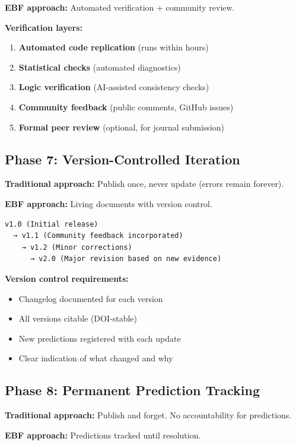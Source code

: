 \textbf{EBF approach:} Automated verification + community review.

\textbf{Verification layers:}
\begin{enumerate}[nosep]
    \item \textbf{Automated code replication} (runs within hours)
    \item \textbf{Statistical checks} (automated diagnostics)
    \item \textbf{Logic verification} (AI-assisted consistency checks)
    \item \textbf{Community feedback} (public comments, GitHub issues)
    \item \textbf{Formal peer review} (optional, for journal submission)
\end{enumerate}

\subsection{Phase 7: Version-Controlled Iteration}

\textbf{Traditional approach:} Publish once, never update (errors remain forever).

\textbf{EBF approach:} Living documents with version control.

\begin{verbatim}
v1.0 (Initial release)
  → v1.1 (Community feedback incorporated)
    → v1.2 (Minor corrections)
      → v2.0 (Major revision based on new evidence)
\end{verbatim}

\textbf{Version control requirements:}
\begin{itemize}[nosep]
    \item Changelog documented for each version
    \item All versions citable (DOI-stable)
    \item New predictions registered with each update
    \item Clear indication of what changed and why
\end{itemize}

\subsection{Phase 8: Permanent Prediction Tracking}

\textbf{Traditional approach:} Publish and forget. No accountability for predictions.

\textbf{EBF approach:} Predictions tracked until resolution.

